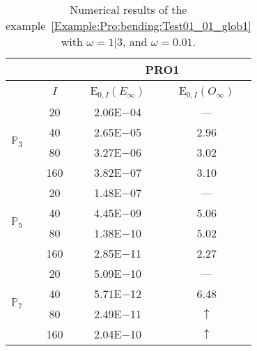 \begin{table}[H]
\caption{Numerical results of the example~\ref{Example:Pro:bending:Test01_01_glob1} with $\omega=1|3$, and $\omega=0.01$.}
\setlength{\tabcolsep}{5pt}
\centering
\begin{tabular}{@{}l c c c@{}}
\toprule
 &  & \multicolumn{2}{c}{PRO1}\\
\midrule
 & $I$ & E$_{0,I}(E_{\infty})$ & E$_{0,I}(O_{\infty})$\\
\midrule
\multirow{4}{*}{$\mathbb{P}_{3}$} & 20 & 2.06E$-$04 & ---\\
 & 40 & 2.65E$-$05 & 2.96\\
 & 80 & 3.27E$-$06 & 3.02\\
 & 160 & 3.82E$-$07 & 3.10\\
\midrule
\multirow{4}{*}{$\mathbb{P}_{5}$} & 20 & 1.48E$-$07 & ---\\
 & 40 & 4.45E$-$09 & 5.06\\
 & 80 & 1.38E$-$10 & 5.02\\
 & 160 & 2.85E$-$11 & 2.27\\
\midrule
\multirow{4}{*}{$\mathbb{P}_{7}$} & 20 & 5.09E$-$10 & ---\\
 & 40 & 5.71E$-$12 & 6.48\\
 & 80 & 2.49E$-$11 & $\uparrow$\\
 & 160 & 2.04E$-$10 & $\uparrow$\\
\bottomrule
\end{tabular}
\label{Table:PRO:test_01_01_test18}
\end{table}
